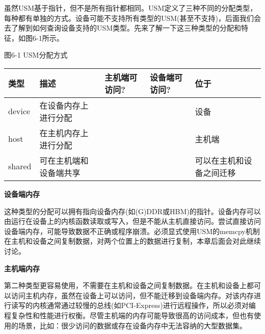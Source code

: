 虽然USM基于指针，但不是所有指针都相同。USM定义了三种不同的分配类型，每种都有单独的方式。设备可能不支持所有类型的USM(甚至不支持)，后面我们会去了解到如何查询设备支持的USM类型。先来了解一下这三种类型的分配和特征，如图6-1所示。\par

\hspace*{\fill} \par %
图6-1 USM分配方式
\begin{table}[H]
	\begin{tabular}{|l|l|l|l|l|}
		\hline
		类型   & 描述                                & 主机端可访问? & 设备端可访问? & 位于                          \\ \hline
		device & 在设备内存上进行分配              & \XSolidBrush                   & \Checkmark                      & 设备                              \\ \hline
		host   & 在主机内存上进行分配                 & \Checkmark                   & \Checkmark                     & 主机端                                \\ \hline
		shared & 可在主机端和设备端共享 & \Checkmark                    & \Checkmark                     & 可以在主机和设备之间迁移 \\ \hline
	\end{tabular}
\end{table}

\hspace*{\fill} \par %
\textbf{设备端内存}

这种类型的分配可以拥有指向设备内存(如(G)DDR或HBM)的指针。设备内存可以由运行在设备上的内核函数读取或写入，但是不能从主机直接访问。尝试直接访问设备端内存，可能导致数据不正确或程序崩溃。必须显式使用USM的memcpy机制在主机和设备之间复制数据，对两个位置上的数据进行复制，本章后面会对此继续讨论。\par

\hspace*{\fill} \par %
\textbf{主机端内存}

第二种类型更容易使用，不需要在主机和设备之间复制数据。在主机和设备上都可以访问主机内存，虽然在设备上可以访问，但不能迁移到设备端内存。对该内存进行读写的内核通常通过较慢的总线(如PCI-Express)进行远程操作，所以必须对编程复杂性和性能进行权衡。尽管主机端的内存可能导致很高的访问成本，但也有使用的场景，比如：很少访问的数据或存在设备内存中无法容纳的大型数据集。\par

